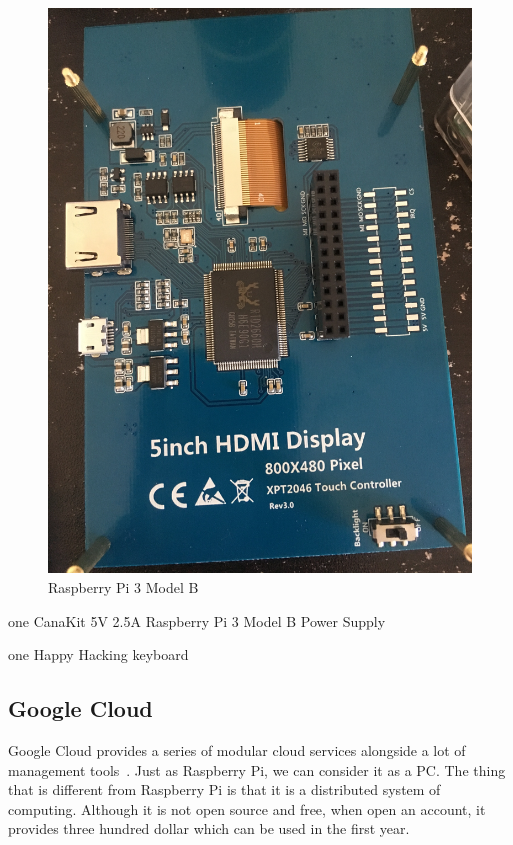 \begin{figure}[!ht]
  \centering\includegraphics[width=\columnwidth]{images/display.jpeg}
  \caption{Raspberry Pi 3 Model B}\label{f:fly}
\end{figure}

one CanaKit 5V 2.5A Raspberry Pi 3 Model B Power Supply

one Happy Hacking keyboard

\subsection{Google Cloud}
Google Cloud provides a series of modular cloud services alongside a lot of
 management tools~\cite{hid-sp18-508-googleCloud}. Just as Raspberry Pi,
 we can consider it as a PC. The thing that is different from Raspberry Pi is
 that it is a distributed system of computing. Although
  it is not open source and free, when open an account,
 it provides three hundred dollar which can be used in the first year.
 
